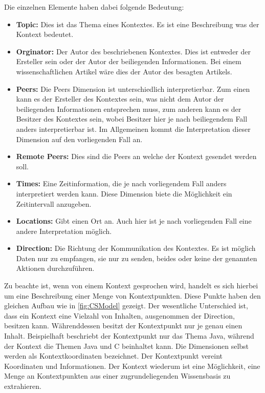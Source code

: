 \documentclass[a4paper]{article}
\begin{document}
	Die einzelnen Elemente haben dabei folgende Bedeutung:
	\begin{itemize}
		\item \textbf{Topic:} Dies ist das Thema eines Kontextes. Es ist eine
		Beschreibung was der Kontext bedeutet.
		\item \textbf{Orginator:} Der Autor des beschriebenen Kontextes. Dies
		ist entweder der Ersteller sein oder der Autor der beiliegenden
		Informationen. Bei einem wissenschaftlichen Artikel wäre dies der Autor
		des besagten Artikels.
		\item \textbf{Peers:} Die Peers Dimension ist unterschiedlich 		
		interpretierbar. Zum einen kann es der Ersteller des Kontextes sein,
		was nicht dem Autor der beiliegenden Informationen entsprechen muss,
		zum anderen kann es	der Besitzer des Kontextes sein, wobei Besitzer hier
		je nach beiliegendem Fall anders interpretierbar ist. Im Allgemeinen
		kommt die Interpretation dieser Dimension auf den vorliegenden Fall an.
		\item \textbf{Remote Peers:} Dies sind die Peers an welche der Kontext
		gesendet werden soll.
		\item \textbf{Times:} Eine Zeitinformation, die je nach vorliegendem Fall
		anders interpretiert werden kann. Diese Dimension biete die Möglichkeit
		ein Zeitintervall anzugeben.
		\item \textbf{Locations:} Gibt einen Ort an. Auch hier ist je nach 
		vorliegenden Fall eine andere Interpretation möglich.
		\item \textbf{Direction:} Die Richtung der Kommunikation des Kontextes.
		Es ist möglich Daten nur zu empfangen, sie nur zu senden, beides oder keine
		der genannten Aktionen durchzuführen.
	\end{itemize} 	
	
	Zu beachte ist, wenn von einem Kontext gesprochen wird, handelt es
	sich hierbei um eine Beschreibung einer Menge von Kontextpunkten. Diese
	Punkte haben den gleichen Aufbau wie in \autoref{fig:CSModel} gezeigt. Der 
	wesentliche Unterschied ist, dass ein Kontext eine Vielzahl von Inhalten,
	ausgenommen der Direction, besitzen kann. Währenddessen besitzt der
	Kontextpunkt nur je genau einen Inhalt. Beispielhaft beschriebt der
	Kontextpunkt nur das Thema Java, während der Kontext die Themen Java und C 
	beinhaltet kann. Die Dimensionen selbst werden als Kontextkoordinaten bezeichnet.
	Der Kontextpunkt vereint Koordinaten und Informationen. Der Kontext wiederum
	ist eine Möglichkeit, eine Menge an Kontextpunkten aus einer zugrundeliegenden
	Wissensbasis zu extrahieren.
	
\end{document}
